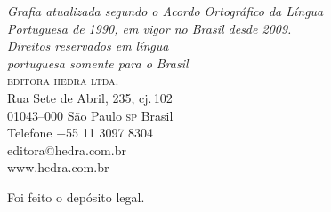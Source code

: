 \mbox{}\vfill

\textit{Grafia atualizada segundo o Acordo Ortográfico da Língua\\
Portuguesa de 1990, em vigor no Brasil desde 2009.}\\

\textit{Direitos reservados em língua\\ 
portuguesa somente para o Brasil}\\

\textsc{editora hedra ltda.}\\
Rua Sete de Abril, 235, cj.\,102\\
01043--000 São Paulo \textsc{sp} Brasil\\
Telefone +55 11 3097 8304\\\smallskip
editora@hedra.com.br\\
www.hedra.com.br\\
\bigskip

Foi feito o depósito legal.

\endgroup
\pagebreak
